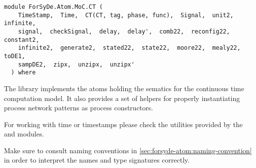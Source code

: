 \label{module:ForSyDe.Atom.MoC.CT}
\haddockbeginheader
{\haddockverb\begin{verbatim}
module ForSyDe.Atom.MoC.CT (
    TimeStamp,  Time,  CT(CT, tag, phase, func),  Signal,  unit2,  infinite, 
    signal,  checkSignal,  delay,  delay',  comb22,  reconfig22,  constant2, 
    infinite2,  generate2,  stated22,  state22,  moore22,  mealy22,  toDE1, 
    sampDE2,  zipx,  unzipx,  unzipx'
  ) where\end{verbatim}}
\haddockendheader

The  library implements the atoms holding the sematics for the
 continuous time computation model. It also provides a set of
 helpers for properly instantiating process network patterns as
 process constructors.\par
For working with time or timestamps please check the utilities
 provided by the  and
  modules.\par
\begin{mdframed}[style=reminder,frametitle=Reminder]Make sure to consult naming conventions in  \cref{sec:forsyde-atom:naming-convention} in order to interpret the names and type signatures correctly.\end{mdframed}\par


